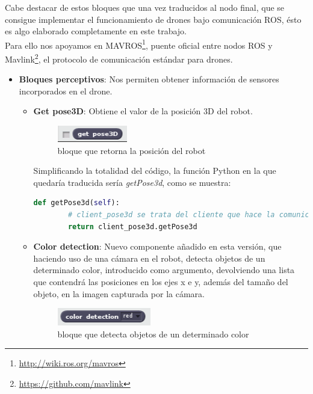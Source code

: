 Cabe destacar de estos bloques que una vez traducidos al nodo final, que se consigue implementar el funcionamiento de drones bajo comunicación ROS, ésto es algo elaborado completamente en este trabajo.\\

Para ello nos apoyamos en MAVROS\footnote{\url{http://wiki.ros.org/mavros}}, puente oficial entre nodos ROS y Mavlink\footnote{\url{https://github.com/mavlink}}, el protocolo de comunicación estándar para drones.

\begin{itemize}
\item \textbf{Bloques perceptivos}:
Nos permiten obtener información de sensores incorporados en el drone.
	\begin{itemize}
	\item \textbf{Get pose3D}: Obtiene el valor de la posición 3D del robot.
		\begin{figure}[H]
     		\centering
     		\includegraphics[scale=1.2]{img/block-pose.png}
     		\caption{bloque que retorna la posición del robot}
  		\label{fig:listas}
		\end{figure}
Simplificando la totalidad del código, la función Python en la que quedaría traducida sería \textit{getPose3d}, como se muestra:\\

\begin{lstlisting}[language=python,firstnumber=1]
    def getPose3d(self):
    	# client_pose3d se trata del cliente que hace la comunicacion ROS
        return client_pose3d.getPose3d
\end{lstlisting}
	\item \textbf{Color detection}: Nuevo componente añadido en esta versión, que haciendo uso de una cámara en el robot, detecta objetos de un determinado color, introducido como argumento, devolviendo una lista que contendrá las posiciones en los ejes x e y, además del tamaño del objeto, en la imagen capturada por la cámara.\\
	\begin{figure}[H]
     		\centering
     		\includegraphics[scale=1.2]{img/block-color.png}
     		\caption{bloque que detecta objetos de un determinado color}
  		\label{fig:listas}
  				\end{figure}
  				

\end{itemize}
\end{itemize}
